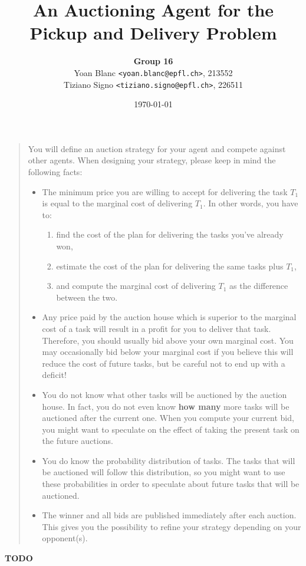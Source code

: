 \documentclass[11pt,a4paper]{article}
\title{\phantomsection%
    An Auctioning Agent for the Pickup and Delivery Problem
}
\author{
    \textbf{Group 16}\\
    Yoan Blanc \texttt{<yoan.blanc@epfl.ch>}, 213552\\
    Tiziano Signo \texttt{<tiziano.signo@epfl.ch>}, 226511
}
\date{\today}
\begin{document}
\maketitle

\noindent
\begin{quote}{\it

    You will define an auction strategy for your agent and compete against other agents.
    When designing your strategy, please keep in mind the following facts:

    \begin{itemize}
        \item The minimum price you are willing to accept for delivering the
            task $T_1$ is equal to the marginal cost of delivering $T_1$. In other
            words, you have to:

            \begin{enumerate}
                \item find the cost of the plan for delivering the tasks you've
                    already won,

                \item estimate the cost of the plan for delivering the same
                    tasks plus $T_1$,

                \item and compute the marginal cost of delivering $T_1$ as the
                    difference between the two.

            \end{enumerate}
        \item Any price paid by the auction house which is superior to the
            marginal cost of a task will result in a profit for you to deliver
            that task. Therefore, you should usually bid above your own
            marginal cost. You may occasionally bid below your marginal cost if
            you believe this will reduce the cost of future tasks, but be
            careful not to end up with a deficit!

        \item You do not know what other tasks will be auctioned by the auction
            house. In fact, you do not even know \textbf{how many} more tasks will be
            auctioned after the current one. When you compute your current bid,
            you might want to speculate on the effect of taking the present
            task on the future auctions.

        \item You do know the probability distribution of tasks. The tasks that
            will be auctioned will follow this distribution, so you might want
            to use these probabilities in order to speculate about future tasks
            that will be auctioned.

        \item The winner and all bids are published immediately after each
            auction. This gives you the possibility to refine your strategy
            depending on your opponent(s).

    \end{itemize}
}\end{quote}

\newpage

\textbf{TODO}
\end{document}
